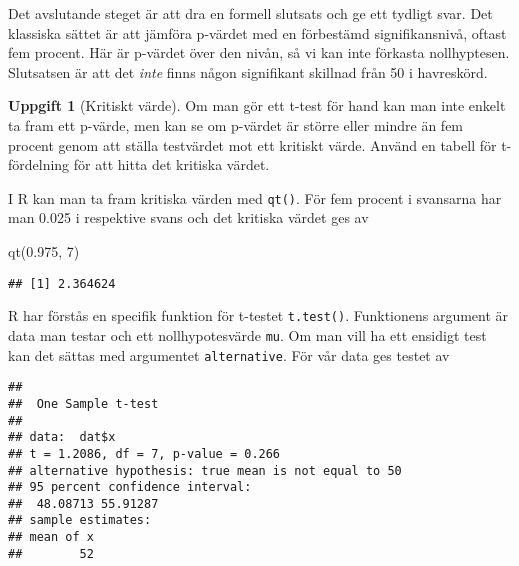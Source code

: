 \documentclass[
]{book}
\newenvironment{Shaded}{\begin{snugshade}}{\end{snugshade}}
\newcommand{\AttributeTok}[1]{\textcolor[rgb]{0.77,0.63,0.00}{#1}}
\newcommand{\CommentTok}[1]{\textcolor[rgb]{0.56,0.35,0.01}{\textit{#1}}}
\newcommand{\DecValTok}[1]{\textcolor[rgb]{0.00,0.00,0.81}{#1}}
\newcommand{\FloatTok}[1]{\textcolor[rgb]{0.00,0.00,0.81}{#1}}
\newcommand{\FunctionTok}[1]{\textcolor[rgb]{0.00,0.00,0.00}{#1}}
\newcommand{\NormalTok}[1]{#1}
\newcommand{\SpecialCharTok}[1]{\textcolor[rgb]{0.00,0.00,0.00}{#1}}
\theoremstyle{definition}
\theoremstyle{definition}
\theoremstyle{definition}
\newtheorem{exercise}{Uppgift}[chapter]
\theoremstyle{definition}
\theoremstyle{remark}
\begin{document}
Det avslutande steget är att dra en formell slutsats och ge ett tydligt svar. Det klassiska sättet är att jämföra p-värdet med en förbestämd signifikansnivå, oftast fem procent. Här är p-värdet över den nivån, så vi kan inte förkasta nollhyptesen. Slutsatsen är att det \emph{inte} finns någon signifikant skillnad från 50 i havreskörd.

\begin{exercise}[Kritiskt värde]

Om man gör ett t-test för hand kan man inte enkelt ta fram ett p-värde, men kan se om p-värdet är större eller mindre än fem procent genom att ställa testvärdet mot ett kritiskt värde. Använd en tabell för t-fördelning för att hitta det kritiska värdet.

I R kan man ta fram kritiska värden med \texttt{qt()}. För fem procent i svansarna har man 0.025 i respektive svans och det kritiska värdet ges av

\begin{Shaded}
\begin{Highlighting}[]
\FunctionTok{qt}\NormalTok{(}\FloatTok{0.975}\NormalTok{, }\DecValTok{7}\NormalTok{)}
\end{Highlighting}
\end{Shaded}

\begin{verbatim}
## [1] 2.364624
\end{verbatim}

\end{exercise}

R har förstås en specifik funktion för t-testet \texttt{t.test()}. Funktionens argument är data man testar och ett nollhypotesvärde \texttt{mu}. Om man vill ha ett ensidigt test kan det sättas med argumentet \texttt{alternative}. För vår data ges testet av

\begin{Shaded}
\end{Shaded}

\begin{verbatim}
## 
##  One Sample t-test
## 
## data:  dat$x
## t = 1.2086, df = 7, p-value = 0.266
## alternative hypothesis: true mean is not equal to 50
## 95 percent confidence interval:
##  48.08713 55.91287
## sample estimates:
## mean of x 
##        52
\end{verbatim}
\end{document}
